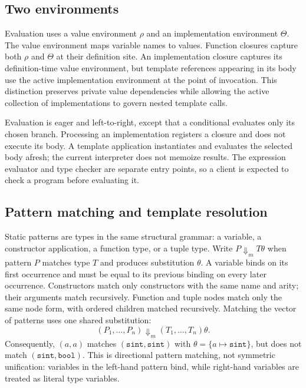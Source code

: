 \documentclass[11pt]{article}
\newcommand{\matchsto}{\mathrel{\Downarrow_{\!m}}}
\begin{document}
\subsection{Two environments}

Evaluation uses a value environment \(\rho\) and an implementation
environment \(\Theta\). The value environment maps variable names to values.
Function closures capture both \(\rho\) and \(\Theta\) at their definition
site. An implementation closure captures its definition-time value
environment, but template references appearing in its body use the active
implementation environment at the point of invocation. This distinction
preserves private value dependencies while allowing the active collection of
implementations to govern nested template calls.

Evaluation is eager and left-to-right, except that a conditional evaluates
only its chosen branch. Processing an implementation registers a closure and
does not execute its body. A template application instantiates and evaluates
the selected body afresh; the current interpreter does not memoize results.
The expression evaluator and type checker are separate entry points, so a
client is expected to check a program before evaluating it.

\subsection{Pattern matching and template resolution}

Static patterns are types in the same structural grammar: a variable, a
constructor application, a function type, or a tuple type. Write
\(P\matchsto T\theta\) when pattern \(P\) matches type \(T\) and produces
substitution \(\theta\). A variable binds on its first occurrence and must
be equal to its previous binding on every later occurrence. Constructors
match only constructors with the same name and arity; their arguments match
recursively. Function and tuple nodes match only the same node form, with
ordered children matched recursively. Matching the vector of patterns uses
one shared substitution:
\[
  (P_1,\ldots,P_n)\matchsto(T_1,\ldots,T_n)\theta.
\]
Consequently, \((a,a)\) matches \((\texttt{sint},\texttt{sint})\) with
\(\theta=\{a\mapsto\texttt{sint}\}\), but does not match
\((\texttt{sint},\texttt{bool})\). This is directional pattern matching,
not symmetric unification: variables in the left-hand pattern bind, while
right-hand variables are treated as literal type variables.
\end{document}
